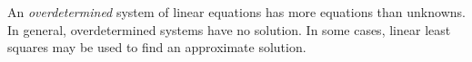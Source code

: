 \documentclass{article}
\begin{document}
An \emph{overdetermined} system of linear equations has more equations than unknowns.  In general, overdetermined systems have no solution.  In some cases, linear least squares may be used to find an approximate solution.
\end{document}
